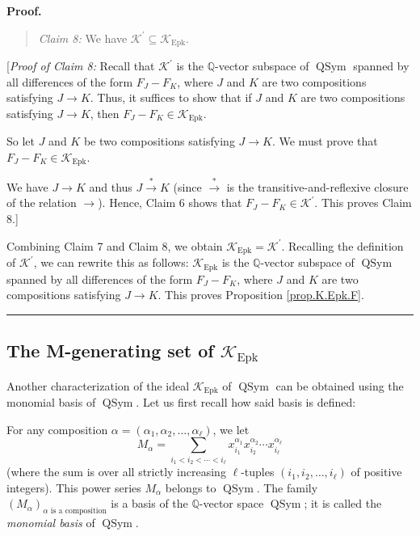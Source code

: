 \documentclass[numbers=enddot,12pt,final,onecolumn,notitlepage]{scrartcl}%
\theoremstyle{definition}
\newenvironment{statement}{\begin{quote}}{\end{quote}}
\newenvironment{proof}[1][Proof]{\noindent\textbf{#1.} }{\ \rule{0.5em}{0.5em}}
\newenvironment{verlong}{}{}
\let\sumnonlimits\sum
\renewcommand{\sum}{\sumnonlimits\limits}
\begin{document}
\begin{verlong}
\begin{proof}
\begin{statement}
\textit{Claim 8:} We have $\mathcal{K}^{\prime}\subseteq\mathcal{K}%
_{\operatorname*{Epk}}$.
\end{statement}

[\textit{Proof of Claim 8:} Recall that $\mathcal{K}^{\prime}$ is the
$\mathbb{Q}$-vector subspace of $\operatorname*{QSym}$ spanned by all
differences of the form $F_{J}-F_{K}$, where $J$ and $K$ are two compositions
satisfying $J\rightarrow K$. Thus, it suffices to show that if $J$ and $K$ are
two compositions satisfying $J\rightarrow K$, then $F_{J}-F_{K}\in
\mathcal{K}_{\operatorname*{Epk}}$.

So let $J$ and $K$ be two compositions satisfying $J\rightarrow K$. We must
prove that $F_{J}-F_{K}\in\mathcal{K}_{\operatorname*{Epk}}$.

We have $J\rightarrow K$ and thus $J\overset{\ast}{\rightarrow}K$ (since
$\overset{\ast}{\rightarrow}$ is the transitive-and-reflexive closure of the
relation $\rightarrow$). Hence, Claim 6 shows that $F_{J}-F_{K}\in
\mathcal{K}^{\prime}$. This proves Claim 8.]

Combining Claim 7 and Claim 8, we obtain $\mathcal{K}_{\operatorname*{Epk}%
}=\mathcal{K}^{\prime}$. Recalling the definition of $\mathcal{K}^{\prime}$,
we can rewrite this as follows: $\mathcal{K}_{\operatorname*{Epk}}$ is the
$\mathbb{Q}$-vector subspace of $\operatorname*{QSym}$ spanned by all
differences of the form $F_{J}-F_{K}$, where $J$ and $K$ are two compositions
satisfying $J\rightarrow K$. This proves Proposition \ref{prop.K.Epk.F}.
\end{proof}
\end{verlong}

\subsection{The M-generating set of $\mathcal{K}_{\operatorname*{Epk}}$}

Another characterization of the ideal $\mathcal{K}_{\operatorname*{Epk}}$ of
$\operatorname*{QSym}$ can be obtained using the monomial basis of
$\operatorname*{QSym}$. Let us first recall how said basis is defined:

For any composition $\alpha=\left(  \alpha_{1},\alpha_{2},\ldots,\alpha_{\ell
}\right)  $, we let%
\[
M_{\alpha}=\sum_{i_{1}<i_{2}<\cdots<i_{\ell}}x_{i_{1}}^{\alpha_{1}}x_{i_{2}%
}^{\alpha_{2}}\cdots x_{i_{\ell}}^{\alpha_{\ell}}%
\]
(where the sum is over all strictly increasing $\ell$-tuples $\left(
i_{1},i_{2},\ldots,i_{\ell}\right)  $ of positive integers). This power series
$M_{\alpha}$ belongs to $\operatorname*{QSym}$. The family $\left(  M_{\alpha
}\right)  _{\alpha\text{ is a composition}}$ is a basis of the $\mathbb{Q}%
$-vector space $\operatorname*{QSym}$; it is called the \textit{monomial
basis} of $\operatorname*{QSym}$.
\end{document}
